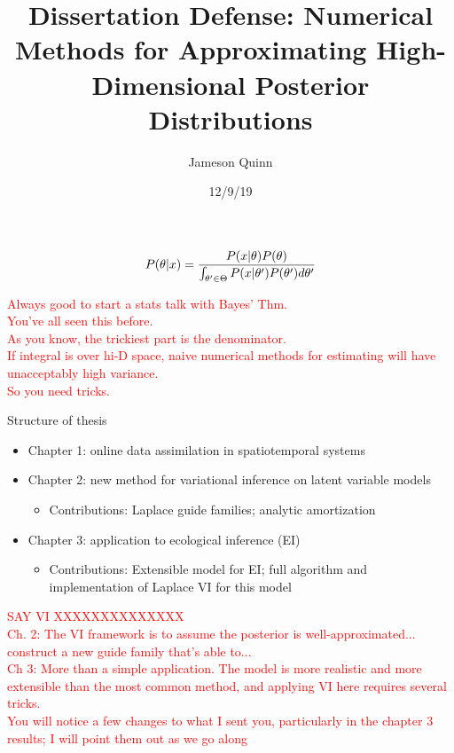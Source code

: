 \documentclass[
  ignorenonframetext,
]{beamer}
\title{Dissertation Defense: Numerical Methods for Approximating
High-Dimensional Posterior Distributions}
\author{Jameson Quinn}
\date{12/9/19}
\providecommand{\tightlist}{%
  \setlength{\itemsep}{0pt}\setlength{\parskip}{0pt}}
\begin{document}
\frame{\titlepage}

\begin{frame}{}
\protect\hypertarget{section}{}

\[\huge{P(\theta|x)=\frac{P(x|\theta)P(\theta)}{\int_{\theta'\in\Theta} P(x|\theta')P(\theta')d\theta'}}\]

\textcolor{red}{{\scriptsize Always good to start a stats talk with Bayes' Thm. \\You've all seen this before.\\     As you know, the trickiest part is the denominator. \\If integral is over hi-D space, naive numerical methods for estimating will have unacceptably high variance. \\So you need tricks.}}

\end{frame}

\begin{frame}{Structure of thesis}
\protect\hypertarget{structure-of-thesis}{}

\begin{itemize}
\tightlist
\item
  Chapter 1: online data assimilation in spatiotemporal systems
\item
  Chapter 2: new method for variational inference on latent variable
  models

  \begin{itemize}
  \tightlist
  \item
    Contributions: Laplace guide families; analytic amortization
  \end{itemize}
\item
  Chapter 3: application to ecological inference (EI)

  \begin{itemize}
  \tightlist
  \item
    Contributions: Extensible model for EI; full algorithm and
    implementation of Laplace VI for this model
  \end{itemize}
\end{itemize}

\textcolor{red}{{\scriptsize SAY VI XXXXXXXXXXXXXX\\Ch. 2: The VI framework is to assume the posterior is well-approximated... construct a new guide family that's able to...\\Ch 3: More than a simple application. The model is more realistic and more extensible than the most common method, and applying VI here requires several tricks.\\You will notice a few changes to what I sent you, particularly in the chapter 3 results; I will point them out as we go along}}

\end{frame}
\end{document}
